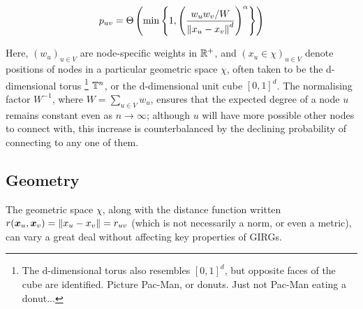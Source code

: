 
\begin{equation}
    p_{uv} = \Theta \left ( \min \left \{
        1,
        \left (
            \frac{w_u w_v / W}{\left\lVert x_u - x_v\right\rVert^d}
        \right )^\alpha
    \right \}
    \right )
\end{equation}

Here, $(w_u)_{u \in V}$ are node-specific weights in $\mathbb{R}^+$, and $(x_u \in \chi)_{u \in V}$ denote positions of nodes in a particular geometric space $\chi$, often taken to be the d-dimensional torus
\footnote{The d-dimensional torus also resembles $[0, 1]^d$, but opposite faces of the cube are identified. Picture Pac-Man, or donuts. Just not Pac-Man eating a donut...}
$\mathbb{T}^n$, or the d-dimensional unit cube $[0, 1]^d$.
The normalising factor $W^{-1}$, where $W = \sum_{u \in V} w_u$, ensures that the expected degree of a node $u$ remains constant even as $n \to \infty$; although $u$ will have more possible other nodes to connect with, this increase is counterbalanced by the declining probability of connecting to any one of them.





\subsection{Geometry}
The geometric space $\chi$, along with the distance function written $r(\bm{x}_u, \bm{x}_v) = \left\lVert x_u - x_v\right\rVert = r_{uv}$ (which is not necessarily a norm, or even a metric), can vary a great deal without affecting key properties of GIRGs.

